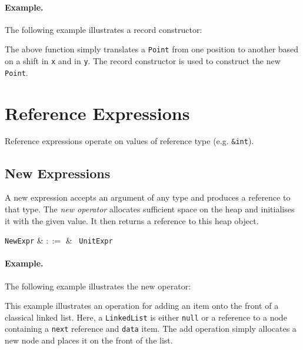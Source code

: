 \paragraph{Example.} The following example illustrates a record constructor:



The above function simply translates a \lstinline{Point} from one position to another based on a shift in \lstinline{x} and in \lstinline{y}.  The record constructor is used to construct the new \lstinline{Point}.

\section{Reference Expressions}

Reference expressions operate on values of reference type (e.g. \lstinline{&int}).


\subsection{New Expressions}
\label{c_expr_new}

A new expression accepts an argument of any type and produces a reference to that type.  The {\em new operator} allocates sufficient space on the heap and initialises it with the given value.  It then returns a reference to this heap object.

\begin{syntax}
\verb+NewExpr+ & $::=$ & \ \verb+UnitExpr+\\
\end{syntax}

\paragraph{Example.} The following example illustrates the new operator:



This example illustrates an operation for adding an item onto the front of a classical linked list.  Here, a \lstinline{LinkedList} is either \lstinline{null} or a reference to a node containing a \lstinline{next} reference and \lstinline{data} item.  The add operation simply allocates a new node and places it on the front of the list.

